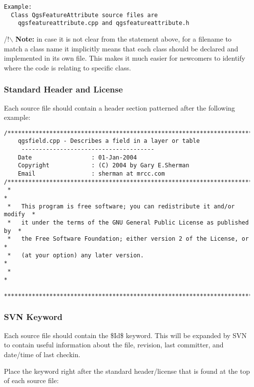 \begin{verbatim}
Example:
  Class QgsFeatureAttribute source files are 
    qgsfeatureattribute.cpp and qgsfeatureattribute.h
\end{verbatim}

/!$\backslash$ \textbf{Note:} in case it is not clear from the statement above, for a filename 
to match a class name it implicitly means that each class should be declared 
and implemented in its own file. This makes it much easier for newcomers to 
identify where the code is relating to specific class.

\hypertarget{toc12}{}
\subsubsection{Standard Header and License}
Each source file should contain a header section patterned after the following
example:

\begin{verbatim}
/***************************************************************************
    qgsfield.cpp - Describes a field in a layer or table
     --------------------------------------
    Date                 : 01-Jan-2004
    Copyright            : (C) 2004 by Gary E.Sherman
    Email                : sherman at mrcc.com
/***************************************************************************
 *                                                                         *
 *   This program is free software; you can redistribute it and/or modify  *
 *   it under the terms of the GNU General Public License as published by  *
 *   the Free Software Foundation; either version 2 of the License, or     *
 *   (at your option) any later version.                                   *
 *                                                                         *
 ***************************************************************************/
\end{verbatim}

\hypertarget{toc13}{}
\subsubsection{SVN Keyword}
Each source file should contain the \$Id\$ keyword. This will be expanded by SVN
to contain useful information about the file, revision, last committer, and
date/time of last checkin.

Place the keyword right after the standard header/license that is found at the
top of each source file:

